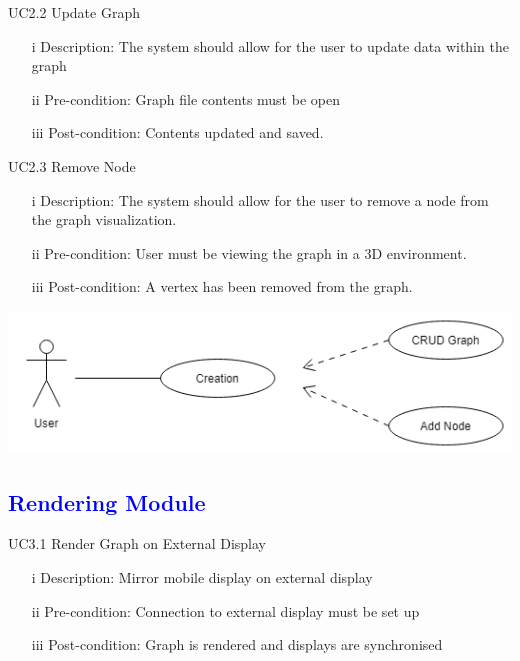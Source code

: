 \documentclass[12pt]{article}
\begin{document}
\bigskip

\begin{flushleft}
UC2.2 Update Graph
\begin{itemize}
\item[i] Description: The system should allow for the user to update data within the graph
\item[ii] Pre-condition: Graph file contents must be open
\item[iii] Post-condition: Contents updated and saved.
\end{itemize}
\end{flushleft}

\bigskip

\begin{flushleft}
UC2.3 Remove Node
\begin{itemize}
\item[i] Description: The system should allow for the user to remove a node from the graph visualization.
\item[ii] Pre-condition: User must be viewing the graph in a 3D environment.
\item[iii] Post-condition: A vertex has been removed from the graph.
\end{itemize}
\end{flushleft}
\bigskip


\includegraphics[scale=0.5]{Dps/Creation.png}

\textcolor{blue}{\subsection{Rendering Module}}

\begin{flushleft}
UC3.1 Render Graph on External Display
\begin{itemize}
\item[i] Description: Mirror mobile display on external display
\item[ii] Pre-condition: Connection to external display must be set up
\item[iii] Post-condition: Graph is rendered and displays are synchronised
\end{itemize}
\end{flushleft}
\end{document}
